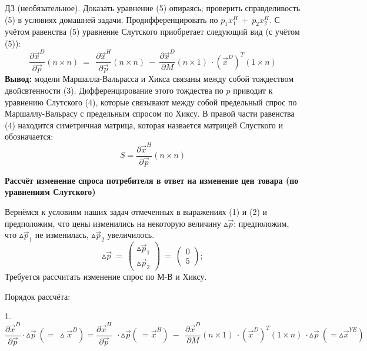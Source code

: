 \documentclass[12pt,a4paper]{article}
\begin{document}
$\displaystyle \boxed{\text{ДЗ}}$ (необязательное). Доказать уравнение (5) опираясь; проверить справделивость (5) в условиях домашней задачи. Продифференцировать по $\displaystyle p_{1} x^{H}_{1} \ +\ p_{2} x^{H}_{2}$. С учётом равенства (5) уравнение Слутского приобретает следующий вид (с учётом (5)):
\begin{equation*}
\frac{\partial \vec{x}^{D}}{\partial \vec{p}}( n\times n) \ =\ \ \frac{\partial \vec{x}^{H}}{\partial \vec{p}}( n\times n) \ -\ \frac{\partial \vec{x}^{D}}{\partial M}( n\times 1) \ \cdot (\vec{x}^{D})^{T}( 1\times n)
\end{equation*}
\textbf{Вывод: }модели Маршалла-Вальрасса и Хикса связаны между собой тождеством двойсвтенности (3). Дифференцирование этого тождества по $\displaystyle p$ приводит к уравнению Слутского (4), которые связывают между собой предельный спрос по Маршаллу-Вальрасу с предельным спросом по Хиксу. В правой части равенства (4) находится симетричная матрица, которая назвается матрицей Слусткого и обозначается:
\begin{equation*}
S=\frac{\partial \vec{x}^{H}}{\partial \vec{p}}( n\times n)
\end{equation*}
\begin{center}

\textbf{Рассчёт изменение спроса потребителя в ответ на изменение цен товара (по уравнениям Слутского)}
\end{center}
Вернёмся к условиям наших задач отмеченных в выражениях (1) и (2) и предположим, что цены изменились на некоторую величину $\displaystyle \vartriangle \vec{p}$; предположим, что $\displaystyle \vartriangle \vec{p}_{1}$ не изменилась, $\displaystyle \vartriangle \vec{p}_{2}$ увеличилось.
\begin{equation*}
\vartriangle \vec{p} \ =\ \begin{pmatrix}
\vartriangle \vec{p}_{1}\\
\vartriangle \vec{p}_{2}
\end{pmatrix} \ =\ \begin{pmatrix}
0\\
5
\end{pmatrix} ;
\end{equation*}
Требуется рассчитать изменение спрос по М-В и Хиксу.

Порядок рассчёта:

	1.
\begin{equation*}
\frac{\partial \vec{x}^{D}}{\partial \vec{p}} \cdot \vartriangle \vec{p} \ \left( =\ \vartriangle \vec{x}^{D}\right) =\frac{\partial \vec{x}^{H}}{\partial \vec{p}} \ \ \cdot \vartriangle \vec{p}\left( \ =\vec{x}^{H}\right) \ -\ \ \frac{\partial \vec{x}^{D}}{\partial M}( n\times 1) \ \cdot (\vec{x}^{D})^{T}( 1\times n) \ \cdot \vartriangle \vec{p} \ \left( =\vartriangle \vec{x}^{YE}\right)
\end{equation*}
\end{document}
